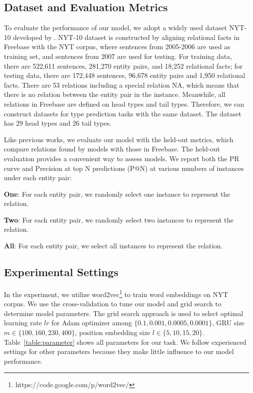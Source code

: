 \documentclass[11pt,a4paper]{article}
\begin{document}
  \subsection{Dataset and Evaluation Metrics}
  To evaluate the performance of our model, we adopt a widely used dataset NYT-10 developed by \citet{riedel2010modeling}. NYT-10 dataset is constructed by aligning relational facts in Freebase \citep{bollacker2008freebase} with the NYT corpus, where sentences from 2005-2006 are used as training set, and sentences from 2007 are used for testing. For training data, there are 522,611 sentences, 281,270 entity pairs, and 18,252 relational facts; for testing data, there are 172,448 sentences, 96,678 entity pairs and 1,950 relational facts. There are 53 relations including a special relation NA, which means that there is no relation between the entity pair in the instance. Meanwhile, all relations in Freebase are defined on head types and tail types. Therefore, we can construct datasets for type prediction tasks with the same dataset. The dataset has 29 head types and 26 tail types.

  Like previous works, we evaluate our model with the held-out metrics, which compare relations found by models with those in Freebase. The held-out evaluation provides a convenient way to assess models. We report both the PR curve and Precision at top N predictions (P@N) at various numbers of instances under each entity pair:
  
  \textbf{One}: For each entity pair, we randomly select one instance to represent the relation.
  
  \textbf{Two}: For each entity pair, we randomly select two instances to represent the relation.

  \textbf{All}: For each entity pair, we select all instances to represent the relation.

  \subsection{Experimental Settings}
  In the experiment, we utilize word2vec\footnote{https://code.google.com/p/word2vec/} to train word embeddings on NYT corpus. We use the cross-validation to tune our model and grid search to determine model parameters. The grid search approach is used to select optimal learning rate $lr$ for Adam optimizer among $\{0.1,0.001,0.0005,0.0001\}$, GRU size $m \in \{100,160,230,400\}$, position embedding size $l \in \{5,10,15,20\}$. Table~\ref{table:parameter} shows all parameters for our task. We follow experienced settings for other parameters because they make little influence to our model performance.
\end{document}
